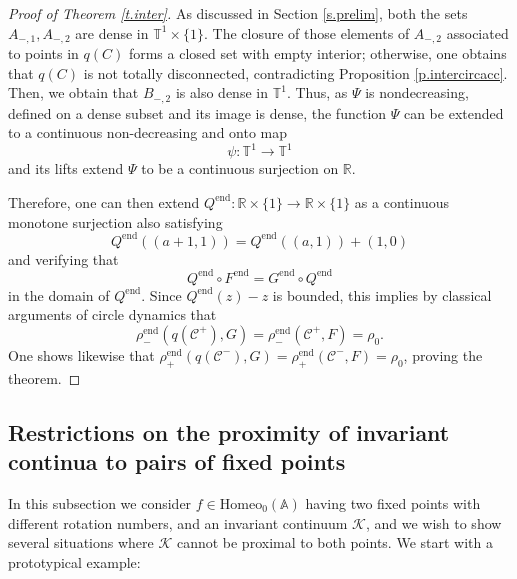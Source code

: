 \documentclass[12pt,a4paper]{amsart}
\theoremstyle{definition}
\theoremstyle{remark}
\newcommand{\T}{\mathbb{T}}
\newcommand{\R}{\mathbb{R}}
\newcommand{\A}{\mathbb{A}}
\begin{document}
\begin{proof}[Proof of Theorem \ref{t.inter}]
As discussed in Section \ref{s.prelim}, both the sets $A_{-,1},A_{-,2}$ are dense in $\T^1\times\{1\}$. 
The closure of
those elements of $A_{-,2}$ associated to points in $q(C)$ forms a closed set with empty interior; otherwise, one obtains
that $q(C)$ is not totally disconnected, contradicting Proposition \ref{p.intercircacc}. Then, we obtain that
$B_{-,2}$ is also dense in $\T^1$. Thus, as $\Psi$ is nondecreasing, defined on a dense subset and its image is dense, the function $\Psi$ can be extended
to a continuous non-decreasing and onto map
$$\psi:\T^1\to \T^1$$
and its lifts extend $\Psi$ to be a continuous surjection on $\R$.


Therefore, one can then extend $Q^{\mathrm{end}}:\R\times\{1\}\to\R\times\{1\}$ as a continuous monotone surjection also satisfying
$$Q^{\mathrm{end}}((a+1,1))= Q^{\mathrm{end}}((a,1))+(1,0)$$ 
and verifying that 
$$Q^{\mathrm{end}}\circ F^{\mathrm{end}}=G^{\mathrm{end}}\circ Q^{\mathrm{end}}$$ in the domain of 
$Q^{\mathrm{end}}$. Since $Q^{\mathrm{end}}(z)- z$ is bounded, this implies by classical arguments
of circle dynamics that 
$$\rho^{\mathrm{end}}_-(q(\mathcal{C}^{+}),G)=\rho^{\mathrm{end}}_-(\mathcal{C}^{+},F)=\rho_0.$$
One shows likewise that $\rho^{\mathrm{end}}_+(q(\mathcal{C}^{-}),G)=\rho^{\mathrm{end}}_+(\mathcal{C}^{-},F)=\rho_0$, proving the theorem.
\end{proof}


\subsection{Restrictions on the proximity of invariant continua to pairs of fixed points}\label{sub.3.3}

In this subsection we consider $f\in\mathrm{Homeo}_0(\A)$ having two fixed points with different rotation numbers, and an invariant continuum $\mathcal{K}$, and we wish to show several situations where $\mathcal{K}$ cannot be proximal to both points. We start with a prototypical example:
\end{document}
